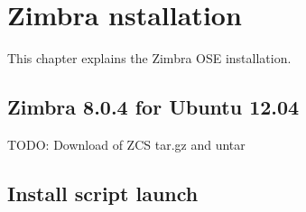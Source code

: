 

\chapter{Zimbra nstallation}
This chapter explains the Zimbra OSE installation.

\section {Zimbra 8.0.4 for Ubuntu 12.04}
TODO: Download of ZCS tar.gz and untar

\section {Install script launch}


